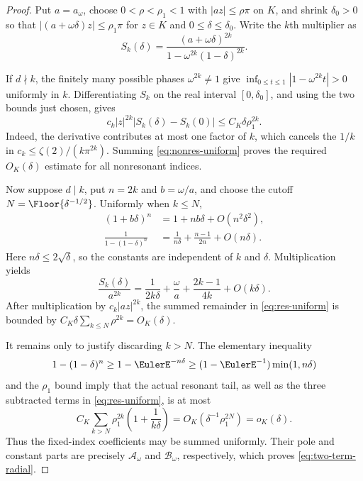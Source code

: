\documentclass[11pt]{article}
\theoremstyle{definition}
\newcommand{\Aact}{\mathscr A}
\newcommand{\Bact}{\mathscr B}
\begin{document}
\begin{proof}
Put $a=a_\omega$, choose $0<\rho<\rho_1<1$ with
$|az|\le\rho\pi$ on $K$, and shrink $\delta_0>0$ so that
$|(a+\omega\delta)z|\le\rho_1\pi$ for $z\in K$ and
$0\le\delta\le\delta_0$.  Write the $k$th multiplier as
\[
 S_k(\delta)=
 \frac{(a+\omega\delta)^{2k}}
 {1-\omega^{2k}(1-\delta)^{2k}}.
\]

If $d\nmid k$, the finitely many possible phases $\omega^{2k}\ne1$ give
\(
 \inf_{0\le t\le1}|1-\omega^{2k}t|>0
\)
uniformly in $k$.  Differentiating $S_k$ on the real interval
$[0,\delta_0]$, and using the two bounds just chosen, gives
\begin{equation}
 c_k|z|^{2k}|S_k(\delta)-S_k(0)|
 \le C_K\delta\rho_1^{2k}.
 \label{eq:nonres-uniform}
\end{equation}
Indeed, the derivative contributes at most one factor of $k$, which cancels
the $1/k$ in $c_k\le\zeta(2)/(k\pi^{2k})$.  Summing
\cref{eq:nonres-uniform} proves the required $O_K(\delta)$ estimate for all
nonresonant indices.

Now suppose $d\mid k$, put $n=2k$ and $b=\omega/a$, and choose the cutoff
$N=\Floor{\delta^{-1/2}}$.  Uniformly when $k\le N$,
\begin{align*}
 (1+b\delta)^n&=1+nb\delta+O(n^2\delta^2),\\
 \frac1{1-(1-\delta)^n}
 &=\frac1{n\delta}+\frac{n-1}{2n}+O(n\delta).
\end{align*}
Here $n\delta\le2\sqrt\delta$, so the constants are independent of $k$ and
$\delta$.  Multiplication yields
\begin{equation}
 \frac{S_k(\delta)}{a^{2k}}
 =\frac1{2k\delta}+\frac{\omega}{a}
  +\frac{2k-1}{4k}+O(k\delta).
 \label{eq:res-uniform}
\end{equation}
After multiplication by $c_k|az|^{2k}$, the summed remainder in
\cref{eq:res-uniform} is bounded by
\(
 C_K\delta\sum_{k\le N}\rho^{2k}=O_K(\delta)
\).

It remains only to justify discarding $k>N$.  The elementary inequality
\[
 1-(1-\delta)^n\ge 1-\EulerE^{-n\delta}
 \ge (1-\EulerE^{-1})\min(1,n\delta)
\]
and the $\rho_1$ bound imply that the actual resonant tail, as well as the
three subtracted terms in \cref{eq:res-uniform}, is at most
\[
 C_K\sum_{k>N}\rho_1^{2k}
 \left(1+\frac1{k\delta}\right)
 =O_K\!\left(\delta^{-1}\rho_1^{2N}\right)=o_K(\delta).
\]
Thus the fixed-index coefficients may be summed uniformly.  Their pole and
constant parts are precisely $\Aact_\omega$ and $\Bact_\omega$, respectively,
which proves \cref{eq:two-term-radial}.
\end{proof}
\end{document}
